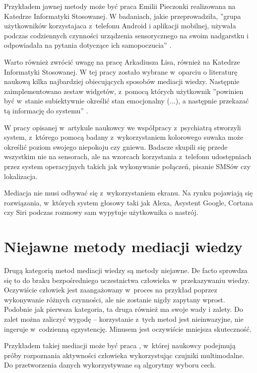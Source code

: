 Przykładem jawnej metody może być praca Emilii Pieczonki realizowana na Katedrze Informatyki Stosowanej. W badaniach, jakie przeprowadziła, ''grupa użytkowników korzystajaca z~telefonu Android i aplikacji mobilnej, używała podczas codziennych czynności urządzenia sensorycznego na swoim nadgarstku i odpowiadała na pytania dotyczące ich samopoczucia'' \cite{EmiliaPieczonka}.

Warto również zwrócić uwagę na pracę Arkadiusza Lisa, również na Katedrze Informatyki Stosowanej. W tej pracy zostało wybrane w~oparciu o literaturę naukową kilka najbardziej obiecujących sposobów mediacji wiedzy. Następnie zaimplementowano zestaw widgetów, z~pomocą których użytkownik ''powinien być w~stanie subiektywnie określić stan emocjonalny (...), a następnie przekazać tą informację do systemu'' \cite{ArkadiuszLis}.

W pracy opisanej w~artykule \cite{hung2016predicting} naukowcy we współpracy z~psychiatrą stworzyli system, z~którego pomocą badany z~wykorzystaniem kolorowego suwaka może określić poziom swojego niepokoju czy gniewu. Badacze skupili się przede wszystkim nie na sensorach, ale na wzorcach korzystania z~telefonu udostępniach przez system operacyjnych takich jak wykonywanie połączeń, pisanie SMSów czy lokalizacja.

Mediacja nie musi odbywać się z~wykorzystaniem ekranu. Na rynku pojawiają się rozwiązania, w~których system głosowy taki jak Alexa, Asystent Google, Cortana czy Siri podczas rozmowy sam wypytuje użytkownika o nastrój.



\section{Niejawne metody mediacji wiedzy}
\label{sec:niejawneMetodyMediacjiWiedzy}

Drugą kategorią metod mediacji wiedzy są metody niejawne. De facto sprowdza się to do braku bezpośredniego uczestnictwa człowieka w~przekazywaniu wiedzy. Oczywiście człowiek jest zaangażowany w~proces na przykład poprzez wykonywanie różnych czynności, ale nie zostanie nigdy zapytany wprost. Podobnie jak pierwsza kategoria, ta druga również ma swoje wady i zalety. Do zalet można zaliczyć wygodę -- korzystanie z~tych metod jest nieinwazyjne, nie ingeruje w~codzienną egzystencję. Minusem jest oczywiście mniejsza skuteczność.

Przykładem takiej mediacji może być praca \cite{zhang2011feature}, w~której naukowcy podejmują próby rozpoznania aktywności człowieka wykorzystując czujniki multimodalne. Do przetworzenia danych wykorzystywane są algorytmy wyboru cech.


